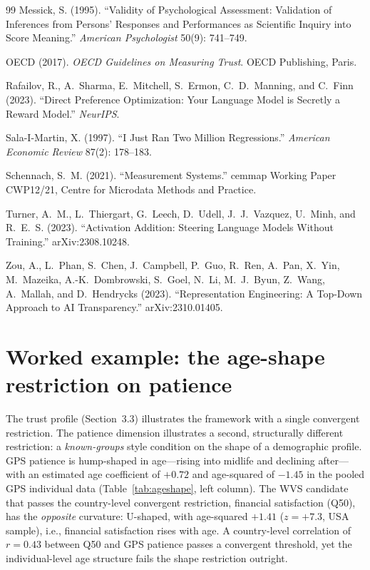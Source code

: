 \documentclass[11pt,letterpaper]{article}
\begin{document}
\begin{thebibliography}{99}
Messick, S. (1995).
``Validity of Psychological Assessment: Validation of Inferences from Persons' Responses and Performances as Scientific Inquiry into Score Meaning.''
\textit{American Psychologist} 50(9): 741--749.

OECD (2017).
\textit{OECD Guidelines on Measuring Trust}.
OECD Publishing, Paris.

Rafailov, R., A.~Sharma, E.~Mitchell, S.~Ermon, C.~D.~Manning, and C.~Finn (2023).
``Direct Preference Optimization: Your Language Model is Secretly a Reward Model.''
\textit{NeurIPS}.

Sala-I-Martin, X. (1997).
``I Just Ran Two Million Regressions.''
\textit{American Economic Review} 87(2): 178--183.

Schennach, S.~M. (2021).
``Measurement Systems.''
cemmap Working Paper CWP12/21, Centre for Microdata Methods and Practice.

Turner, A.~M., L.~Thiergart, G.~Leech, D.~Udell, J.~J.~Vazquez, U.~Minh, and R.~E.~S. (2023).
``Activation Addition: Steering Language Models Without Training.''
arXiv:2308.10248.

Zou, A., L.~Phan, S.~Chen, J.~Campbell, P.~Guo, R.~Ren, A.~Pan, X.~Yin, M.~Mazeika, A.-K.~Dombrowski, S.~Goel, N.~Li, M.~J.~Byun, Z.~Wang, A.~Mallah, and D.~Hendrycks (2023).
``Representation Engineering: A Top-Down Approach to AI Transparency.''
arXiv:2310.01405.

\end{thebibliography}

\appendix

\section{Worked example: the age-shape restriction on patience}

\label{app:patience}

The trust profile (Section~3.3) illustrates the framework with a single convergent restriction. The patience dimension illustrates a second, structurally different restriction: a \emph{known-groups} style condition on the shape of a demographic profile. GPS patience is hump-shaped in age---rising into midlife and declining after---with an estimated age coefficient of $+0.72$ and age-squared of $-1.45$ in the pooled GPS individual data (Table~\ref{tab:ageshape}, left column). The WVS candidate that passes the country-level convergent restriction, financial satisfaction (Q50), has the \emph{opposite} curvature: U-shaped, with age-squared $+1.41$ ($z = +7.3$, USA sample), i.e., financial satisfaction rises with age. A country-level correlation of $r = 0.43$ between Q50 and GPS patience passes a convergent threshold, yet the individual-level age structure fails the shape restriction outright.
\end{document}
